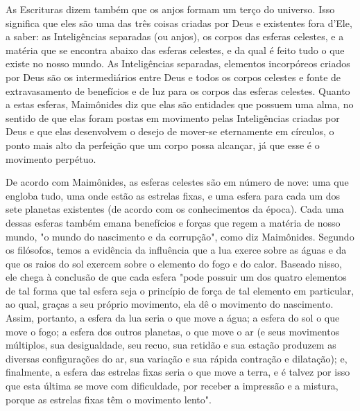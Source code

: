 \begin{itemize}
\begin{enumrate}
As Escrituras dizem também que os anjos formam um terço do uni­verso.
Isso significa que eles são uma das três coisas criadas por Deus e
existen­tes fora d'Ele, a saber: as Inteligências separadas (ou anjos),
os corpos das esfe­ras celestes, e a matéria que se encontra abaixo das
esferas celestes, e da qual é feito tudo o que existe no nosso mundo. As
Inteligências separadas, elemen­tos incorpóreos criados por Deus são os
intermediários entre Deus e todos os corpos celestes e fonte de
extravasamento de benefícios e de luz para os cor­pos das esferas
celestes. Quanto a estas esferas, Maimônides diz que elas são entidades
que possuem uma alma, no sentido de que elas foram postas em mo­vimento
pelas Inteligências criadas por Deus e que elas desenvolvem o desejo de
mover-se eternamente em círculos, o ponto mais alto da perfeição que um
corpo possa alcançar, já que esse é o movimento perpétuo.

De acordo com Maimônides, as esferas celestes são em número de nove: uma
que engloba tudo, uma onde estão as estrelas fixas, e uma esfera para
cada um dos sete planetas existentes (de acordo com os conhecimentos da
época). Cada uma dessas esferas também emana benefícios e forças que
re­gem a matéria de nosso mundo, "o mundo do nascimento e da corrupção",
como diz Maimônides. Segundo os filósofos, temos a evidência da
influência que a lua exerce sobre as águas e da que os raios do sol
exercem sobre o ele­mento do fogo e do calor. Baseado nisso, ele chega à
conclusão de que cada esfera "pode possuir um dos quatro elementos de
tal forma que tal esfera seja o princípio de força de tal elemento em
particular, ao qual, graças a seu próprio movimento, ela dê o movimento
do nascimento. Assim, portanto, a esfera da lua seria o que move a água;
a esfera do sol o que move o fogo; a esfera dos outros planetas, o que
move o ar (e seus movimentos múltiplos, sua desigual­dade, seu recuo,
sua retidão e sua estação produzem as diversas configurações do ar, sua
variação e sua rápida contração e dilatação); e, finalmente, a esfera
das estrelas fixas seria o que move a terra, e é talvez por isso que
esta última se move com dificuldade, por receber a impressão e a
mistura, porque as estre­las fixas têm o movimento lento".


\end{enumrate}
\end{itemize}
